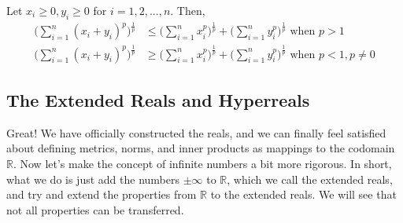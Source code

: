   \begin{lemma}
    Let $x_i \geq 0, y_i \geq 0$ for $i = 1, 2, ... ,n$. Then, 
    \begin{align*}
        \bigg( \sum_{i=1}^n (x_i + y_i)^p \bigg)^{\frac{1}{p}} & \leq \bigg( \sum_{i=1}^n x_i^p \bigg)^\frac{1}{p} + \bigg( \sum_{i=1}^n y_i^p \bigg)^{\frac{1}{p}} \text{  when } p > 1 \\
        \bigg( \sum_{i=1}^n (x_i + y_i)^p \bigg)^{\frac{1}{p}} & \geq \bigg( \sum_{i=1}^n x_i^p \bigg)^\frac{1}{p} + \bigg( \sum_{i=1}^n y_i^p \bigg)^{\frac{1}{p}} \text{  when } p < 1, p \neq 0
    \end{align*}
  \end{lemma}

\subsection{The Extended Reals and Hyperreals}

  Great! We have officially constructed the reals, and we can finally feel satisfied about defining metrics, norms, and inner products as mappings to the codomain $\mathbb{R}$. Now let's make the concept of infinite numbers a bit more rigorous. In short, what we do is just add the numbers $\pm \infty$ to $\mathbb{R}$, which we call the extended reals, and try and extend the properties from $\mathbb{R}$ to the extended reals. We will see that not all properties can be transferred. 

